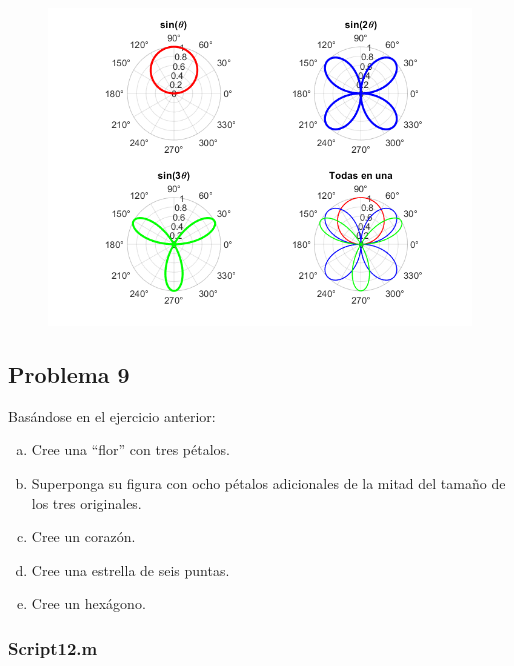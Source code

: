 \documentclass{article}
\begin{document}
	\begin{figure}[h]
		\centering
		\includegraphics[width=\textwidth]{grafica11.png}
	\end{figure}
	
	\newpage
	
	\subsection{Problema 9}
	
	Basándose en el ejercicio anterior:
	
	\begin{enumerate}[a)]
		\item Cree una “flor” con tres pétalos.
		\\
		\item Superponga su figura con ocho pétalos adicionales de la mitad del tamaño de los tres originales.
		\\
		\item Cree un corazón.
		\\
		\item Cree una estrella de seis puntas.
		\\
		\item Cree un hexágono.
		\\
	\end{enumerate}
		
	\newpage
	
	\subsubsection{Script12.m}
	
\end{document}
